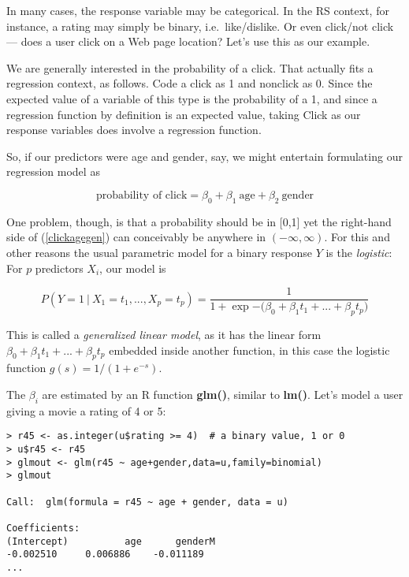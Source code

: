 In many cases, the response variable may be categorical.  In the RS
context, for instance, a rating may simply be binary, i.e.\
like/dislike.  Or even click/not click --- does a user click on a Web page
location?  Let's use this as our example.

We are generally interested in the probability of a click.  That
actually fits a regression context, as follows.  Code a click as 1 and
nonclick as 0.  Since the expected value of a variable of this type is
the probability of a 1, and since a regression function by definition
is an expected value, taking Click as our response variables does
involve a regression function.

So, if our predictors were age and gender, say, we might entertain
formulating our regression model as

\begin{equation}
\label{clickagegen}
\textrm{probability of click} = \beta_0 + \beta_1 ~ \textrm{age} +
\beta_2 ~ \textrm{gender}
\end{equation}

One problem, though, is that a probability should be in [0,1] yet the
right-hand side of (\ref{clickagegen}) can conceivably be anywhere in
$(-\infty,\infty)$.  For this and other reasons the usual parametric
model for a binary response $Y$ is the \textit{logistic}:  For $p$
predictors $X_i$, our model is

\begin{equation}
P(Y  = 1 ~|~ X_1=t_1,...,X_p=t_p) =
\frac{1}{1+\exp{-(\beta_0+\beta_1 t_1+...+\beta_p t_p})}
\end{equation}

This is called a \textit{generalized linear model}, as it has the linear
form $\beta_0+\beta_1 t_1+...+\beta_p t_p$ embedded inside
another function, in this case the logistic function $g(s) =
1/(1+e^{-s})$.

The $\beta_i$ are estimated by an R function \textbf{glm()}, similar to
\textbf{lm()}.  Let's model a user giving a movie a rating of 4 or 5:

\begin{lstlisting}
> r45 <- as.integer(u$rating >= 4)  # a binary value, 1 or 0
> u$r45 <- r45
> glmout <- glm(r45 ~ age+gender,data=u,family=binomial)
> glmout

Call:  glm(formula = r45 ~ age + gender, data = u)

Coefficients:
(Intercept)          age      genderM  
-0.002510     0.006886    -0.011189  
...
\end{lstlisting}

